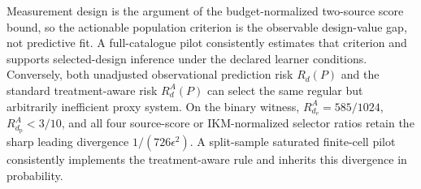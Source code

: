 Measurement design is the argument of the budget-normalized two-source score bound, so the actionable population criterion is the observable design-value gap, not predictive fit. A full-catalogue pilot consistently estimates that criterion and supports selected-design inference under the declared learner conditions. Conversely, both unadjusted observational prediction risk \(R_d(P)\) and the standard treatment-aware risk \(R_d^A(P)\) can select the same regular but arbitrarily inefficient proxy system. On the binary witness, \(R_{d_{\mathrm e}}^A=585/1024\), \(R_{d_{\mathrm p}}^A<3/10\), and all four source-score or IKM-normalized selector ratios retain the sharp leading divergence \(1/(726\epsilon^2)\). A split-sample saturated finite-cell pilot consistently implements the treatment-aware rule and inherits this divergence in probability.